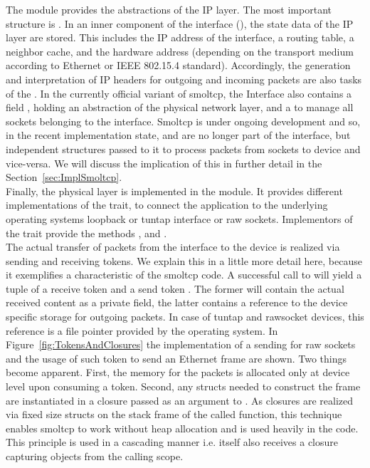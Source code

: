 The  module provides the abstractions of the IP layer. The most important structure is . In an inner component of the interface (), the state data of the IP layer are stored. This includes the IP address of the interface, a routing table, a neighbor cache, and the hardware address (depending on the transport medium according to Ethernet or IEEE 802.15.4 standard). Accordingly, the generation and interpretation of IP headers for outgoing and incoming packets are also tasks of the 
. In the currently official variant of smoltcp, the Interface also contains a field , holding an abstraction of the physical network layer, and a  to manage all sockets belonging to the interface. Smoltcp is under ongoing development and so, in the recent implementation state,  and  are no longer part of the interface, but independent structures passed to it to process packets from sockets to device and vice-versa. We will discuss the implication of this in further detail in the Section~\ref{sec:ImplSmoltcp}. \\

Finally, the physical layer is implemented in the  module. It provides different implementations of the  trait, to connect the application to the underlying operating systems loopback or tuntap interface or raw sockets. Implementors of the  trait provide the methods ,  and .\\

The actual transfer of packets from the interface to the device is realized via sending and receiving tokens. We explain this in a little more detail here, because it exemplifies a characteristic of the smoltcp code. A successful call to  will yield a tuple of a receive token  and a send token . The former will contain the actual received content as a private field, the latter contains a reference to the device specific storage for outgoing packets. In case of tuntap and rawsocket devices, this reference is a file pointer provided by the operating system. In Figure~\ref{fig:TokensAndClosures} the implementation of a sending  for raw sockets and the usage of such token to send an Ethernet frame are shown. Two things become apparent. First, the memory for the packets is allocated only at device level upon consuming a token. Second, any structs needed to construct the frame are instantiated in a closure passed as an argument to . As closures are realized via fixed size structs on the stack frame of the called function, this technique enables smoltcp to work without heap allocation and is used heavily in the code. This principle is used in a cascading manner i.e.  itself also receives a closure capturing objects from the calling scope.\\

